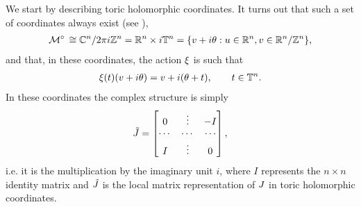 \documentclass[notas.tex]{subfiles}
\begin{document}

	


	We start by describing toric holomorphic coordinates. It turns out that such a set of coordinates always exist (see \cite[Appendix A]{abreu_kahler_2003}),
	\begin{align} \label{eq_kt_coords}
		\mfld^\circ \cong \cmplx^n/2\pi i \ints^n = \reals^n\times i \torus^n = \{v+i\theta:u\in \reals^n, v \in \reals^n/\ints^n\},
	\end{align}
	and that, in these coordinates, the action $\xi$ is such that
	\begin{align*}
		\xi(t) (v+i\theta)=v+i(\theta+t), \qquad t \in \mathbb{T}^n.
	\end{align*}
	In these coordinates the complex structure is simply
	\begin{align*}
		\tilde{J} = \begin{bmatrix}
			0 & \vdots & - I \\
			\cdots & \cdots & \cdots \\
			I & \vdots & 0
		\end{bmatrix},
	\end{align*}
	i.e. it is the multiplication by the imaginary unit $i$, where $I$ represents the $n\times n$ identity matrix and $\tilde {J}$ is the local matrix representation of $J$ in toric holomorphic coordinates.
	
\end{document}
